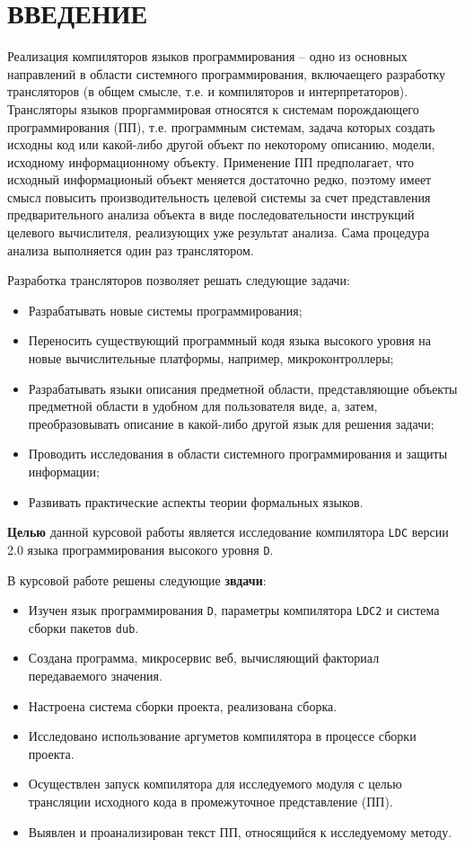 \documentclass{studrep}
\begin{document}
\tableofcontents

\chapter*{ВВЕДЕНИЕ}
\label{chap:intro}

Реализация компиляторов языков программирования -- одно из основных направлений в области системного программирования, включаещего разработку трансляторов (в общем смысле, т.е. и компиляторов и интерпретаторов).  Трансляторы языков проргаммировая относятся к системам порождающего программирования (ПП), т.е. программным системам, задача которых создать исходны код или какой-либо другой объект по некоторому описанию, модели, исходному информационному объекту.  Применение ПП предполагает, что исходный информационый объект меняется достаточно редко, поэтому имеет смысл повысить производительность целевой системы за счет представления предварительного анализа объекта в виде последовательности инструкций целевого вычислителя, реализующих уже результат анализа.  Сама процедура анализа выполняется один раз транслятором.

Разработка трансляторов позволяет решать следующие задачи:
\begin{itemize}
\item Разрабатывать новые системы программирования;
\item Переносить существующий программный кодя языка высокого уровня на новые вычислительные платформы, например, микроконтроллеры;
\item Разрабатывать языки описания предметной области, представляющие объекты предметной области в удобном для пользователя виде, а, затем, преобразовывать описание в какой-либо другой язык для решения задачи;
\item Проводить исследования в области системного программирования и защиты информации;
\item Развивать практические аспекты теории формальных языков.
\end{itemize}

\textbf{Целью} данной курсовой работы является исследование компилятора \verb|LDC| версии 2.0 языка программирования высокого уровня \verb|D|.

В курсовой работе решены следующие \textbf{звдачи}:
\begin{itemize}
\item Изучен язык программирования \verb|D|, параметры компилятора \verb|LDC2| и система сборки пакетов \verb|dub|.
\item Создана программа, микросервис веб, вычисляющий факториал передаваемого значения.
\item Настроена система сборки проекта, реализована сборка.
\item Исследовано использование аргуметов компилятора в процессе сборки проекта.
\item Осуществлен запуск компилятора для исследуемого модуля с целью трансляции исходного кода в промежуточное представление (ПП).
\item Выявлен и проанализирован текст ПП, относящийся к исследуемому методу.
\end{itemize}
\end{document}
